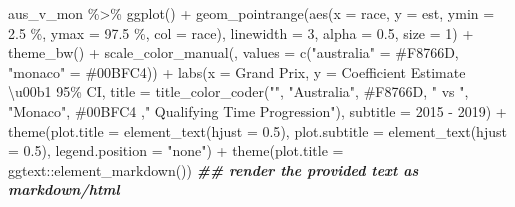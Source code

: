 \documentclass[
]{book}
\newenvironment{Shaded}{\begin{snugshade}}{\end{snugshade}}
\newcommand{\AttributeTok}[1]{\textcolor[rgb]{0.77,0.63,0.00}{#1}}
\newcommand{\DecValTok}[1]{\textcolor[rgb]{0.00,0.00,0.81}{#1}}
\newcommand{\DocumentationTok}[1]{\textcolor[rgb]{0.56,0.35,0.01}{\textbf{\textit{#1}}}}
\newcommand{\FloatTok}[1]{\textcolor[rgb]{0.00,0.00,0.81}{#1}}
\newcommand{\FunctionTok}[1]{\textcolor[rgb]{0.00,0.00,0.00}{#1}}
\newcommand{\NormalTok}[1]{#1}
\newcommand{\OtherTok}[1]{\textcolor[rgb]{0.56,0.35,0.01}{#1}}
\newcommand{\SpecialCharTok}[1]{\textcolor[rgb]{0.00,0.00,0.00}{#1}}
\newcommand{\StringTok}[1]{\textcolor[rgb]{0.31,0.60,0.02}{#1}}
\begin{document}
\begin{Shaded}
\begin{Highlighting}[]
\NormalTok{aus\_v\_mon }\SpecialCharTok{\%\textgreater{}\%}
  \FunctionTok{ggplot}\NormalTok{() }\SpecialCharTok{+}
  \FunctionTok{geom\_pointrange}\NormalTok{(}\FunctionTok{aes}\NormalTok{(}\AttributeTok{x =}\NormalTok{ race, }\AttributeTok{y =}\NormalTok{ est, }\AttributeTok{ymin =} \StringTok{\textasciigrave{}}\AttributeTok{2.5 \%}\StringTok{\textasciigrave{}}\NormalTok{, }\AttributeTok{ymax =} \StringTok{\textasciigrave{}}\AttributeTok{97.5 \%}\StringTok{\textasciigrave{}}\NormalTok{, }\AttributeTok{col =}\NormalTok{ race), }
                  \AttributeTok{linewidth =} \DecValTok{3}\NormalTok{, }\AttributeTok{alpha =} \FloatTok{0.5}\NormalTok{, }\AttributeTok{size =} \DecValTok{1}\NormalTok{) }\SpecialCharTok{+}
  \FunctionTok{theme\_bw}\NormalTok{() }\SpecialCharTok{+}
  \FunctionTok{scale\_color\_manual}\NormalTok{(}\StringTok{\textquotesingle{}\textquotesingle{}}\NormalTok{, }\AttributeTok{values =} \FunctionTok{c}\NormalTok{(}\StringTok{"australia"} \OtherTok{=} \StringTok{\textquotesingle{}\#F8766D\textquotesingle{}}\NormalTok{, }\StringTok{"monaco"} \OtherTok{=} \StringTok{\textquotesingle{}\#00BFC4\textquotesingle{}}\NormalTok{)) }\SpecialCharTok{+} 
  \FunctionTok{labs}\NormalTok{(}\AttributeTok{x =} \StringTok{\textquotesingle{}Grand Prix\textquotesingle{}}\NormalTok{, }\AttributeTok{y =} \StringTok{\textquotesingle{}Coefficient Estimate \textbackslash{}u00b1 95\% CI\textquotesingle{}}\NormalTok{,}
       \AttributeTok{title =} \FunctionTok{title\_color\_coder}\NormalTok{(}\StringTok{""}\NormalTok{, }\StringTok{"Australia"}\NormalTok{, }\StringTok{\textquotesingle{}\#F8766D\textquotesingle{}}\NormalTok{, }\StringTok{" vs "}\NormalTok{, }\StringTok{"Monaco"}\NormalTok{, }\StringTok{\textquotesingle{}\#00BFC4\textquotesingle{}}\NormalTok{ ,}\StringTok{" Qualifying Time Progression"}\NormalTok{), }
       \AttributeTok{subtitle =} \StringTok{\textquotesingle{}2015 {-} 2019\textquotesingle{}}\NormalTok{) }\SpecialCharTok{+} 
  \FunctionTok{theme}\NormalTok{(}\AttributeTok{plot.title =} \FunctionTok{element\_text}\NormalTok{(}\AttributeTok{hjust =} \FloatTok{0.5}\NormalTok{),}
        \AttributeTok{plot.subtitle =} \FunctionTok{element\_text}\NormalTok{(}\AttributeTok{hjust =} \FloatTok{0.5}\NormalTok{),}
        \AttributeTok{legend.position =} \StringTok{"none"}\NormalTok{) }\SpecialCharTok{+}
  \FunctionTok{theme}\NormalTok{(}\AttributeTok{plot.title =}\NormalTok{ ggtext}\SpecialCharTok{::}\FunctionTok{element\_markdown}\NormalTok{()) }\DocumentationTok{\#\# render the provided text as markdown/html}
\end{Highlighting}
\end{Shaded}
\end{document}
